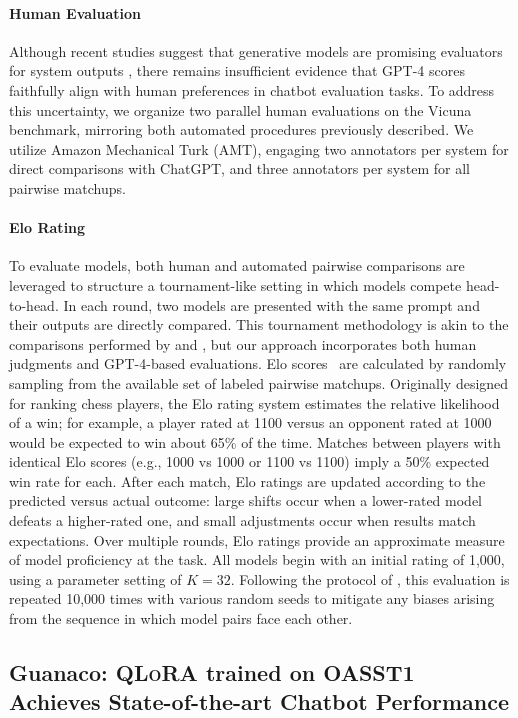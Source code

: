 \paragraph{Human Evaluation} Although recent studies suggest that generative models are promising evaluators for system outputs \citep{fu2023gptscore}, there remains insufficient evidence that GPT-4 scores faithfully align with human preferences in chatbot evaluation tasks. To address this uncertainty, we organize two parallel human evaluations on the Vicuna benchmark, mirroring both automated procedures previously described. We utilize Amazon Mechanical Turk (AMT), engaging two annotators per system for direct comparisons with ChatGPT, and three annotators per system for all pairwise matchups.

\paragraph{Elo Rating} To evaluate models, both human and automated pairwise comparisons are leveraged to structure a tournament-like setting in which models compete head-to-head. In each round, two models are presented with the same prompt and their outputs are directly compared. This tournament methodology is akin to the comparisons performed by \citet{bai2022training} and \citet{vicuna2023}, but our approach incorporates both human judgments and GPT-4-based evaluations. Elo scores~\citep{elo1967proposed,elo1978rating} are calculated by randomly sampling from the available set of labeled pairwise matchups. Originally designed for ranking chess players, the Elo rating system estimates the relative likelihood of a win; for example, a player rated at 1100 versus an opponent rated at 1000 would be expected to win about 65\% of the time. Matches between players with identical Elo scores (e.g., 1000 vs 1000 or 1100 vs 1100) imply a 50\% expected win rate for each. After each match, Elo ratings are updated according to the predicted versus actual outcome: large shifts occur when a lower-rated model defeats a higher-rated one, and small adjustments occur when results match expectations. Over multiple rounds, Elo ratings provide an approximate measure of model proficiency at the task. All models begin with an initial rating of 1,000, using a parameter setting of $K=32$. Following the protocol of \citet{vicuna2023}, this evaluation is repeated 10,000 times with various random seeds to mitigate any biases arising from the sequence in which model pairs face each other.

\subsection{\textbf{Guanaco}: \textsc{QLoRA} trained on OASST1 Achieves State-of-the-art Chatbot Performance} 

